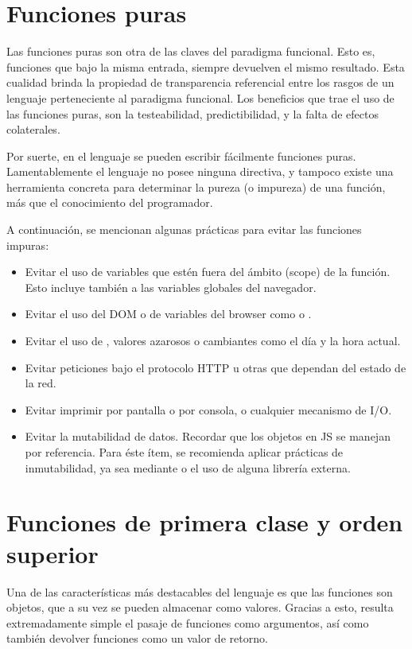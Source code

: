 \section{Funciones puras}

Las funciones puras son otra de las claves del paradigma funcional. Esto es, funciones que bajo la misma entrada, siempre devuelven el mismo resultado. Esta cualidad brinda la propiedad de transparencia referencial entre los rasgos de un lenguaje perteneciente al paradigma funcional. Los beneficios que trae el uso de las funciones puras, son la testeabilidad, predictibilidad, y la falta de efectos colaterales.

Por suerte, en el lenguaje se pueden escribir fácilmente funciones puras. Lamentablemente el lenguaje no posee ninguna directiva, y tampoco existe una herramienta concreta para determinar la pureza (o impureza) de una función, más que el conocimiento del programador.

A continuación, se mencionan algunas prácticas para evitar las funciones impuras:

\begin{itemize}
  \item Evitar el uso de variables que estén fuera del ámbito (scope) de la función. Esto incluye también a las variables globales del navegador.
  \item Evitar el uso del DOM o de variables del browser como  o .
	\item Evitar el uso de , valores azarosos o cambiantes como el día y la hora actual.
	\item Evitar peticiones bajo el protocolo HTTP u otras que dependan del estado de la red.
	\item Evitar imprimir por pantalla o por consola, o cualquier mecanismo de I/O.
	\item Evitar la mutabilidad de datos. Recordar que los objetos en JS se manejan por referencia. Para éste ítem, se recomienda aplicar prácticas de inmutabilidad, ya sea mediante  o el uso de alguna librería externa.
\end{itemize}

\section{Funciones de primera clase y orden superior}

Una de las características más destacables del lenguaje es que las funciones son objetos, que a su vez se pueden almacenar como valores. Gracias a esto, resulta extremadamente simple el pasaje de funciones como argumentos, así como también devolver funciones como un valor de retorno.

